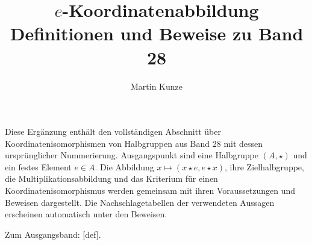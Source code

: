 \documentclass[main.tex]{subfiles}
\title{\(e\)-Koordinatenabbildung\\[.5em]\large Definitionen und Beweise zu Band 28}
\author{Martin Kunze}
\date{}
\begin{document}
\hypersetup{pageanchor=false}
\maketitle
\hypersetup{pageanchor=true,hypertexnames=false}
\ProofWideReasonsNearFormula
Diese Ergänzung enthält den vollständigen Abschnitt über Koordinatenisomorphismen
von Halbgruppen aus Band 28 mit dessen ursprünglicher Nummerierung.
Ausgangspunkt sind eine Halbgruppe \((A,\star)\) und ein festes Element \(e\in A\).
Die Abbildung \(x\mapsto(x\star e,e\star x)\), ihre Zielhalbgruppe, die
Multiplikationsabbildung und das Kriterium für einen Koordinatenisomorphismus
werden gemeinsam mit ihren Voraussetzungen und Beweisen dargestellt.
Die Nachschlagetabellen der verwendeten Aussagen erscheinen automatisch
unter den Beweisen.
\par\medskip
Zum Ausgangsband: [def].

\end{document}
